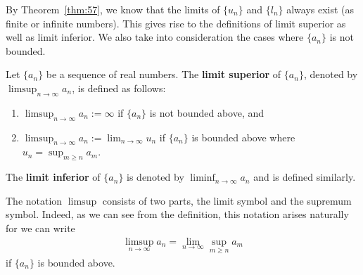 \documentclass[thmcnt=section, 12pt]{my-elegantbook}
\begin{document}
By Theorem~\ref{thm:57}, we know that the limits of $\{u_n\}$ and $\{l_n\}$ always exist (as finite or infinite numbers). This gives rise to the definitions of limit superior as well as limit inferior. We also take into consideration the cases where $\{a_n\}$ is not bounded.

\begin{definition}
    Let $\{a_n\}$ be a sequence of real numbers. The \textbf{limit superior} of $\{a_n\}$, denoted by $\limsup_{n \to \infty} a_n$, is defined as follows:
    \begin{enumerate}
        \item $\limsup_{n \to \infty} a_n := \infty$ if $\{a_n\}$ is not bounded above, and 
        \item $\limsup_{n \to \infty} a_n := \lim_{n \to \infty} u_n$ if $\{a_n\}$ is bounded above where $u_n = \sup_{m \geq n} a_m$.
    \end{enumerate}
    The \textbf{limit inferior} of $\{a_n\}$ is denoted by $\liminf_{n \to \infty} a_n$ and is defined similarly.
\end{definition}

\begin{note}
    The notation $\limsup$ consists of two parts, the limit symbol and the supremum symbol. Indeed, as we can see from the definition, this notation arises naturally for we can write
    \begin{align*}
        \limsup_{n \to \infty} a_n
        = \lim_{n \to \infty} \sup_{m \geq n} a_m
    \end{align*}
    if $\{a_n\}$ is bounded above.
\end{note}
\end{document}
